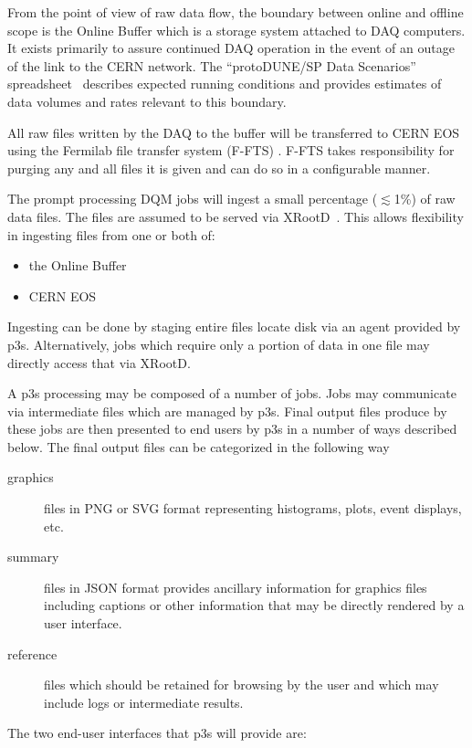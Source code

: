 \documentclass[pdftex,12pt,letter]{article}
\newcommand{\pd}{protoDUNE\xspace}
\begin{document}
From the point of view of raw data flow, the boundary between online and offline scope is the Online Buffer which is a storage system attached to DAQ computers.
It exists primarily to assure continued DAQ operation in the event of an outage of the link to the CERN network.
The ``\pd/SP Data Scenarios'' spreadsheet~\cite{docdb1086}
describes expected running conditions and provides estimates
of data volumes and rates relevant to this boundary.

All raw files written by the DAQ to the buffer will be transferred to CERN EOS
using the Fermilab file transfer system (F-FTS) \cite{docdb1212,fts}.
F-FTS takes responsibility for purging any and all files it is given and can do so in a configurable manner.

The prompt processing DQM jobs will ingest a small percentage ($\lesssim$1\%) of raw data files.
The files are assumed to be served via XRootD~\cite{xrootd}.
This allows flexibility in ingesting files from one or both of:
\begin{itemize}
\item the Online Buffer
\item CERN EOS~\cite{eos}
\end{itemize}
Ingesting can be done by staging entire files locate disk via an agent provided by p3s.
Alternatively, jobs which require only a portion of data in one file may directly access that via XRootD.

A p3s processing may be composed of a number of jobs.  
Jobs may communicate via intermediate files which are managed by p3s.
Final output files produce by these jobs are then presented to end users by p3s in a number of ways described below.
The final output files can be categorized in the following way

\begin{description}
\item[graphics] files in PNG or SVG format representing histograms, plots, event displays, etc.
\item[summary] files in JSON format provides ancillary information for graphics files including captions or other information that may be directly rendered by a user interface.
\item[reference] files which should be retained for browsing by the user and which may include logs or intermediate results. 
\end{description}

\noindent The two end-user interfaces that p3s will provide are:
\end{document}
